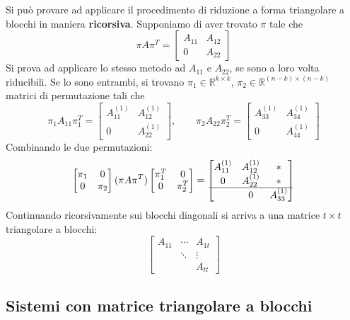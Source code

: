 \documentclass[12pt,a4paper,]{report}
\begin{document}
\begin{nota}
    Si può provare ad applicare il procedimento di riduzione a forma triangolare a blocchi in maniera \textbf{ricorsiva}. Supponiamo di aver trovato $\pi$ tale che
    \[
    \pi A \pi^T = \begin{bmatrix} A_{11} & A_{12} \\ 0 & A_{22}\end{bmatrix}
    \]
    Si prova ad applicare lo stesso metodo ad $A_{11}$ e $A_{22}$, se sono a loro volta riducibili. Se lo sono entrambi, si trovano $\pi_1\in\mathbb{R}^{k\times k}$, $\pi_2\in\mathbb{R}^{(n-k)\times(n-k)}$ matrici di permutazione tali che
    \[
    \pi_1 A_{11}\pi_1^T = \begin{bmatrix} A_{11}^{(1)} & A_{12}^{(1)} \\ 0 & A_{22}^{(1)}\end{bmatrix}, \qquad
    \pi_2 A_{22}\pi_2^T = \begin{bmatrix} A_{33}^{(1)} & A_{34}^{(1)} \\ 0 & A_{44}^{(1)}\end{bmatrix}
    \]
    Combinando le due permutazioni:
    \[
    \begin{bmatrix}\pi_1 & 0 \\ 0 & \pi_2\end{bmatrix}(\pi A \pi^T)\begin{bmatrix}\pi_1^T & 0 \\ 0 & \pi_2^T\end{bmatrix}
    = \begin{bmatrix} A_{11}^{(1)} & A_{12}^{(1)} & * \\ 0 & A_{22}^{(1)} & * \\ \hline & 0 & A_{33}^{(1)}\end{bmatrix}
    \]
    Continuando ricorsivamente sui blocchi diagonali si arriva a una matrice $t\times t$ triangolare a blocchi:
    \[
    \begin{bmatrix} A_{11} & \cdots & A_{1t} \\ & \ddots & \vdots \\ & & A_{tt}\end{bmatrix}
    \]
\end{nota}

\subsection{Sistemi con matrice triangolare a blocchi}
\end{document}
